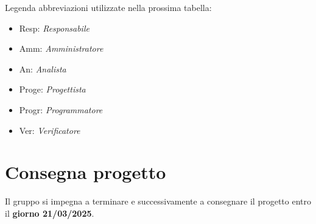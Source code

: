 \noindent Legenda abbreviazioni utilizzate nella prossima tabella:
\vspace{-0.5\baselineskip}
\begin{itemize}[noitemsep]
    \item Resp: \textit{Responsabile}
    \item Amm: \textit{Amministratore}
    \item An: \textit{Analista}
    \item Proge: \textit{Progettista}
    \item Progr: \textit{Programmatore}
    \item Ver: \textit{Verificatore}
\end{itemize}

\newpage



\section{Consegna progetto}
Il gruppo si impegna a terminare e successivamente a consegnare il progetto entro il \textbf{giorno 21/03/2025}.\\


